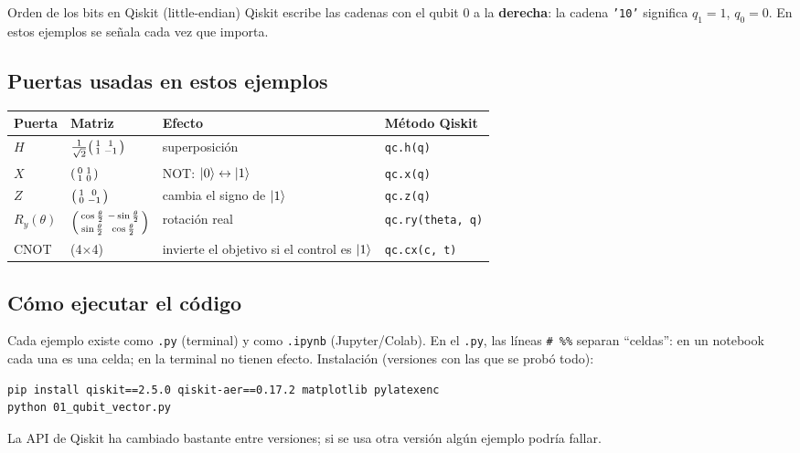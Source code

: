 \begin{nota}{Orden de los bits en Qiskit (little-endian)}
Qiskit escribe las cadenas con el qubit $0$ a la \textbf{derecha}: la cadena
\texttt{'10'} significa $q_1=1$, $q_0=0$. En estos ejemplos se señala cada
vez que importa.
\end{nota}

\subsection{Puertas usadas en estos ejemplos}
\begin{center}
\begin{tabular}{@{}llll@{}}
\toprule
Puerta & Matriz & Efecto & Método Qiskit\\
\midrule
$H$ & $\frac1{\sqrt2}\begin{psmallmatrix}1&1\\1&-1\end{psmallmatrix}$ &
  superposición & \texttt{qc.h(q)}\\
$X$ & $\begin{psmallmatrix}0&1\\1&0\end{psmallmatrix}$ &
  NOT: $\left|0\right\rangle\leftrightarrow\left|1\right\rangle$ & \texttt{qc.x(q)}\\
$Z$ & $\begin{psmallmatrix}1&0\\0&-1\end{psmallmatrix}$ &
  cambia el signo de $\left|1\right\rangle$ & \texttt{qc.z(q)}\\
$R_y(\theta)$ &
  $\begin{psmallmatrix}\cos\frac\theta2&-\sin\frac\theta2\\
  \sin\frac\theta2&\cos\frac\theta2\end{psmallmatrix}$ &
  rotación real & \texttt{qc.ry(theta, q)}\\
CNOT & (4$\times$4) & invierte el objetivo si el control es $\left|1\right\rangle$ &
  \texttt{qc.cx(c, t)}\\
\bottomrule
\end{tabular}
\end{center}

\subsection{Cómo ejecutar el código}
Cada ejemplo existe como \texttt{.py} (terminal) y como \texttt{.ipynb}
(Jupyter/Colab). En el \texttt{.py}, las líneas \texttt{\# \%\%} separan
``celdas'': en un notebook cada una es una celda; en la terminal no tienen
efecto. Instalación (versiones con las que se probó todo):
\begin{lstlisting}[style=salida]
pip install qiskit==2.5.0 qiskit-aer==0.17.2 matplotlib pylatexenc
python 01_qubit_vector.py
\end{lstlisting}
La API de Qiskit ha cambiado bastante entre versiones; si se usa otra versión
algún ejemplo podría fallar.


